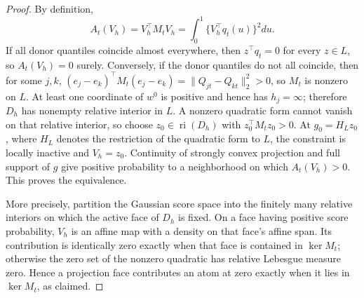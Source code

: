 \documentclass{article}
\begin{document}
\begin{proof}
By definition,
\[
 A_t(V_h)=V_h^\top M_tV_h
 =\int_0^1\{V_h^\top q_t(u)\}^2du.
\]
If all donor quantiles coincide almost everywhere, then \(z^\top q_t=0\) for every \(z\in L\), so \(A_t(V_h)=0\) surely.  Conversely, if the donor quantiles do not all coincide, then for some \(j,k\),
\((e_j-e_k)^\top M_t(e_j-e_k)=\|Q_{jt}-Q_{kt}\|_2^2>0\), so \(M_t\) is nonzero on \(L\).  At least one coordinate of \(w^0\) is positive and hence has \(h_j=\infty\); therefore \(D_h\) has nonempty relative interior in \(L\).  A nonzero quadratic form cannot vanish on that relative interior, so choose \(z_0\in\operatorname{ri}(D_h)\) with \(z_0^\top M_tz_0>0\).  At \(g_0=H_Lz_0\), where \(H_L\) denotes the restriction of the quadratic form to \(L\), the constraint is locally inactive and \(V_h=z_0\).  Continuity of strongly convex projection and full support of \(g\) give positive probability to a neighborhood on which \(A_t(V_h)>0\).  This proves the equivalence.

More precisely, partition the Gaussian score space into the finitely many relative interiors on which the active face of \(D_h\) is fixed.  On a face having positive score probability, \(V_h\) is an affine map with a density on that face's affine span.  Its contribution is identically zero exactly when that face is contained in \(\ker M_t\); otherwise the zero set of the nonzero quadratic has relative Lebesgue measure zero.  Hence a projection face contributes an atom at zero exactly when it lies in \(\ker M_t\), as claimed.
\end{proof}
\end{document}
